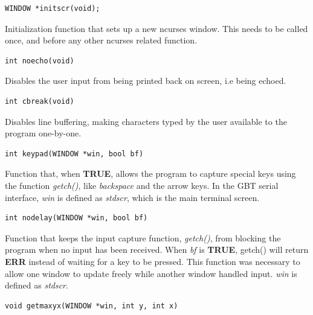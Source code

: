 \documentclass[main.tex]{subfiles}
\begin{document}

\begin{lstlisting}[frame=single] 
WINDOW *initscr(void);
\end{lstlisting}

Initialization function that sets up a new ncurses window. This needs to be called once, and before any other ncurses related function.\\

\begin{lstlisting}[frame=single] 
int noecho(void)
\end{lstlisting}

Disables the user input from being printed back on screen, i.e being echoed.  \\

\begin{lstlisting}[frame=single] 
int cbreak(void)
\end{lstlisting}

Disables line buffering, making characters typed by the user available to the program one-by-one.\\

\begin{lstlisting}[frame=single] 
int keypad(WINDOW *win, bool bf)
\end{lstlisting}

Function that, when \textbf{TRUE}, allows the program to capture special keys using the function \textit{getch()}, like \textit{backspace} and the arrow keys. In the GBT serial interface, \textit{win} is defined as \textit{stdscr}, which is the main terminal screen. \\

\begin{lstlisting}[frame=single] 
int nodelay(WINDOW *win, bool bf)
\end{lstlisting}

Function that keeps the input capture function, \textit{getch()}, from blocking the program when no input has been received. When \textit{bf} is \textbf{TRUE}, getch() will return \textbf{ERR} instead of waiting for a key to be pressed. This function was necessary to allow one window to update freely while another window handled input. \textit{win} is defined as \textit{stdscr}.\\

\begin{lstlisting}[frame=single] 
void getmaxyx(WINDOW *win, int y, int x)
\end{lstlisting}
\end{document}
